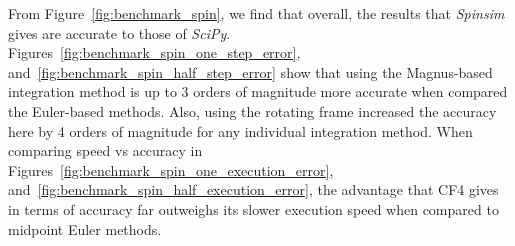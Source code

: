 \documentclass{jors}
\begin{document}
		From Figure~\ref{fig:benchmark_spin}, we find that overall, the results that \emph{Spinsim} gives are accurate to those of \emph{SciPy}.
		Figures~\ref{fig:benchmark_spin_one_step_error}, and~\ref{fig:benchmark_spin_half_step_error} show that using the Magnus-based integration method is up to 3 orders of magnitude more accurate when compared the Euler-based methods.
		Also, using the rotating frame increased the accuracy here by 4 orders of magnitude for any individual integration method.
		When comparing speed vs accuracy in Figures~\ref{fig:benchmark_spin_one_execution_error}, and~\ref{fig:benchmark_spin_half_execution_error}, the advantage that CF4 gives in terms of accuracy far outweighs its slower execution speed when compared to midpoint Euler methods.
\end{document}
